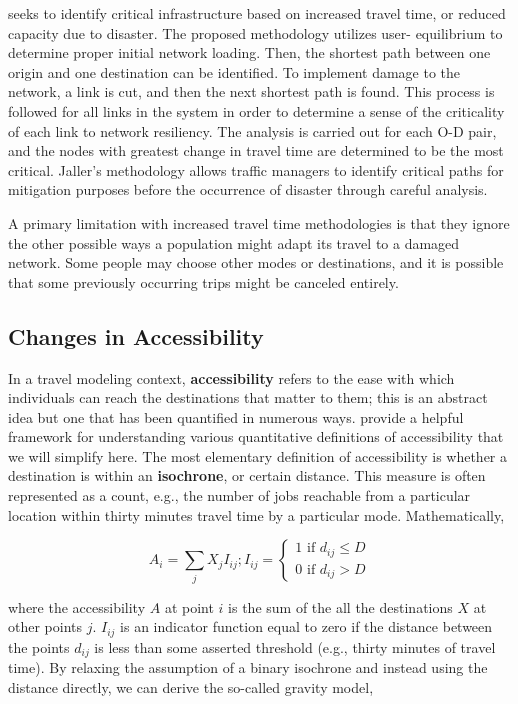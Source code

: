 \cite{jaller2015} seeks to identify critical infrastructure based on
increased travel time, or
reduced capacity due to disaster. The proposed methodology utilizes user-
equilibrium to determine
proper initial network loading. Then, the shortest path between one origin
and one destination
can be identified. To implement damage to the network, a link is cut, and
then the next shortest
path is found. This process is followed for all links in the system in
order to determine a sense
of the criticality of each link to network resiliency. The analysis is
carried out for each O-D
pair, and the nodes with greatest change in travel time are determined to
be the most critical.
Jaller’s methodology allows traffic managers to identify critical paths
for mitigation purposes
before the occurrence of disaster through careful analysis.

A primary limitation with increased travel time methodologies is that they
ignore the other possible ways a population might adapt its travel to a
damaged
network. Some people may choose other modes or destinations, and it is
possible
that some previously occurring trips might be canceled entirely.

\subsection{Changes in Accessibility}
In a travel modeling context, \textbf{accessibility} refers to the ease
with which
individuals can reach the destinations that matter to them; this is an
abstract
idea but one that has been quantified in numerous ways. \cite{dong2006}
provide a
helpful framework for understanding various quantitative definitions of
accessibility that we will simplify here. The most elementary definition of
accessibility is whether a destination is within an \textbf{isochrone}, or
certain
distance. This measure is often represented as a count, e.g., the number
of jobs
reachable from a particular location within thirty minutes travel time by a
particular mode. Mathematically,

\begin{equation}
A_i = \sum_{j} X_j I_{ij}; I_{ij} = \begin{cases}  1 \text{ if } d_{ij}
\leq D\\
0 \text{ if } d_{ij} > D \end{cases}
	\label{eqn:isochrone}
\end{equation}

where the accessibility \(A\) at point \(i\) is the sum of the all the
destinations \(X\) at other points \(j\). \(I_{ij}\) is an indicator
function equal to
zero if the distance between the points $d_{ij}$ is less than some asserted
threshold (e.g., thirty minutes of travel time). By relaxing the
assumption of a
binary isochrone and instead using the distance directly, we can derive the
so-called gravity model,

